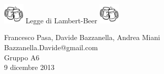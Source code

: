\begin{center}
        \includegraphics[width=10mm]{beer.pdf}
     	{\huge \; Legge di Lambert-Beer \;}
     	\includegraphics[width=10mm]{beer.pdf}
    \vspace{0.1cm}

      	{Francesco Pasa, Davide Bazzanella, Andrea Miani} \\
      	{Bazzanella.Davide@gmail.com} \\
		{Gruppo A6} \\
	
	\vspace{0.1cm}
      	{9 dicembre 2013}
    \vspace{-0.2cm}

\end{center}
